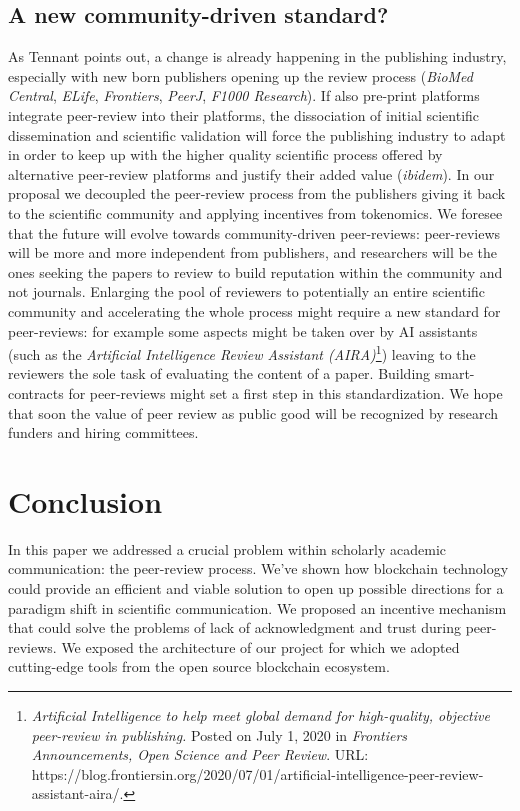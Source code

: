 \documentclass[runningheads]{llncs}
\begin{document}
\subsection{A new community-driven standard?}
As Tennant points out\cite{Tennant2017-F1000R}, a change is already happening in the publishing industry, especially with new born publishers opening up the review process (\emph{BioMed Central}, \emph{ELife}, \emph{Frontiers}, \emph{PeerJ}, \emph{F1000 Research}). If also pre-print platforms integrate peer-review into their platforms, the dissociation of initial scientific dissemination and scientific validation will force the publishing industry to adapt in order to keep up with the higher quality scientific process offered by alternative peer-review platforms and justify their added value (\emph{ibidem}).
In our proposal we decoupled the peer-review process from the publishers giving it back to the scientific community and applying incentives from tokenomics. We foresee that the future will evolve towards community-driven peer-reviews: peer-reviews will be more and more independent from publishers, and researchers will be the ones seeking the papers to review to build reputation within the community and not journals.
\newline Enlarging the pool of reviewers to potentially an entire scientific community and accelerating the whole process might require a new standard for peer-reviews: for example some aspects might be taken over by AI assistants (such as the \emph{Artificial Intelligence Review Assistant (AIRA)}\footnote[20]{\emph{Artificial Intelligence to help meet global demand for high-quality, objective peer-review in publishing.} Posted on July 1, 2020 in \emph{Frontiers Announcements, Open Science and Peer Review}. \textsc{URL:} https://blog.frontiersin.org/2020/07/01/artificial-intelligence-peer-review-assistant-aira/.}) leaving to the reviewers the sole task of evaluating the content of a paper. Building smart-contracts for peer-reviews might set a first step in this standardization. We hope that soon the value of peer review as public good will be recognized by research funders and hiring committees.

\section{Conclusion}
In this paper we addressed a crucial problem within scholarly academic communication: the peer-review process. We've shown how blockchain technology could provide an efficient and viable solution to open up possible directions for a paradigm shift in scientific communication. We proposed an incentive mechanism that could solve the problems of lack of acknowledgment and trust during peer-reviews. We exposed the architecture of our project for which we adopted cutting-edge tools from the open source blockchain ecosystem.
\end{document}
